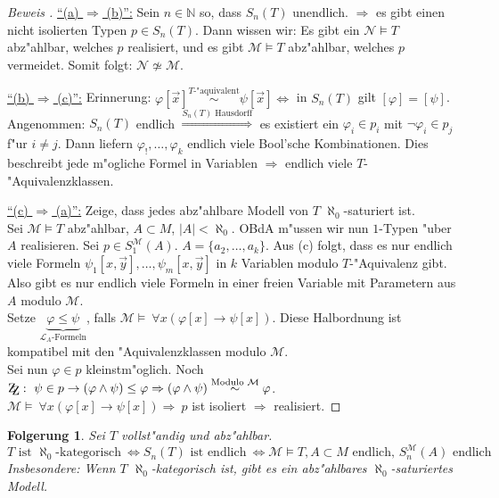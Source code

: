 \documentclass[a4paper,12pt,numbers=noenddot,parskip=full]{scrartcl}
\newcommand{\setN}{\mathbb{N}}
\newcommand{\Forall}{~\forall}
\newcommand{\scrL}{\mathcal{L}}
\newcommand{\scrM}{\mathcal{M}}
\newcommand{\scrN}{\mathcal{N}}
\newcommand{\zz}{\mathrm{Z\kern-.3em\raise-0.5ex\hbox{Z}}:~}
\theoremstyle{dotless}
\newtheorem{corollary}[theorem]{Folgerung}
\begin{document}
\begin{proof}[Beweis ]
	\underline{"`(a) $\Rightarrow$ (b)"':} Sein $n \in \setN$ so, dass $S_n(T)$ unendlich. $\Rightarrow$ es gibt einen nicht isolierten Typen $p \in S_n(T)$. Dann wissen wir: Es gibt ein $\scrN \models T$ abz"ahlbar, welches $p$ realisiert, und es gibt $\scrM \models T$ abz"ahlbar, welches $p$ vermeidet. Somit folgt: $\scrN \not\simeq \scrM$.
	
	\underline{"`(b) $\Rightarrow$ (c)"':} Erinnerung: $\varphi[\vec{x}] \overset{T\text{-"aquivalent}}{\sim} \psi[\vec{x}] \Leftrightarrow$ in $S_n(T)$ gilt $[\varphi]=[\psi]$.\\
	Angenommen: $S_n(T)$ endlich $\overset{S_n(T) \text{ Hausdorff}}{\Longrightarrow}$ es existiert ein $\varphi_i \in p_i$ mit $\lnot \varphi_i \in p_j$ f"ur $i \neq j$. Dann liefern $\varphi_!, \dots, \varphi_k$ endlich viele Bool'sche Kombinationen. Dies beschreibt jede m"ogliche Formel in Variablen $\Longrightarrow$ endlich viele $T$-"Aquivalenzklassen.
	
	\underline{"`(c) $\Rightarrow$ (a)"':} Zeige, dass jedes abz"ahlbare Modell von $T$ $\aleph_0$-saturiert ist.\\
	Sei $\scrM \models T$ abz"ahlbar, $A\subset M$, $|A| < \aleph_0$. OBdA m"ussen wir nun $1$-Typen "uber $A$ realisieren. Sei $p \in S_1^\scrM(A)$. $A=\{a_2, \dots, a_k \}$. Aus (c) folgt, dass es nur endlich viele Formeln $\psi_1[x, \vec{y}], \dots, \psi_m [x, \vec{y}]$ in $k$ Variablen modulo $T$-"Aquivalenz gibt. Also gibt es nur endlich viele Formeln in einer freien Variable mit Parametern aus $A$ modulo \underline{\emph{$\scrM$}}.\\
	Setze $\underbrace{\varphi \leq \psi}_{\scrL_A\text{-Formeln}}$, falls $\scrM \models \Forall x (\varphi[x] \rightarrow \psi[x])$. Diese Halbordnung ist kompatibel mit den "Aquivalenzklassen modulo $\scrM$.\\
	Sei nun $\varphi \in p$ kleinstm"oglich. Noch $\zz \psi \in p \rightarrow (\varphi \land \psi) \leq \varphi \Rightarrow (\varphi \land \psi) \overset{\text{Modulo }\scrM}{\sim} \varphi$.\\
	$\scrM \models \Forall {x} (\varphi[x]\rightarrow\psi[x]) \Rightarrow~ p$ ist isoliert $\Rightarrow$ realisiert.
\end{proof}
\begin{corollary}
	Sei $T$ vollst"andig und abz"ahlbar.
	\begin{equation*}
		T \text{ ist } \aleph_0 \text{-kategorisch} ~\Leftrightarrow S_n(T) \text{ ist endlich} ~\Leftrightarrow \scrM \models T, A \subset M \text{ endlich, } S_n^\scrM(A) \text{ endlich}
	\end{equation*}
	\emph{Insbesondere:} Wenn $T$ $\aleph_0$-kategorisch ist, gibt es ein abz"ahlbares $\aleph_0$-saturiertes Modell.
\end{corollary}
\end{document}
